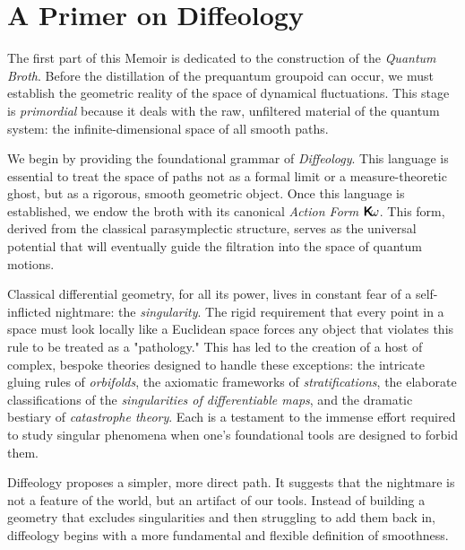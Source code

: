 \documentclass[10pt,reqno,letterpaper,twoside]{amsbook}
\begin{document}
  
  
  \chapter{A Primer on Diffeology}
  \label{chap:A Primer on Diffeology}
  
  The first part of this Memoir is dedicated to the construction of the \emph{Quantum Broth}.
  Before the distillation of the prequantum groupoid can occur,
  we must establish the geometric reality of the space of dynamical fluctuations.
  This stage is \emph{primordial} because it deals with the raw,
  unfiltered material of the quantum system:
  the infinite-dimensional space of all smooth paths.
  
  We begin by providing the foundational grammar of \emph{Diffeology}.
  This language is essential to treat the space of paths not as a formal limit or a measure-theoretic ghost,
  but as a rigorous,
  smooth geometric object.
  Once this language is established,
  we endow the broth with its canonical \emph{Action Form} $\boldsymbol{\mathsf{K}}\!\omega$.
  This form,
  derived from the classical parasymplectic structure,
  serves as the universal potential that will eventually guide the filtration into the space of quantum motions.
  
  Classical differential geometry,
  for all its power,
  lives in constant fear of a self-inflicted nightmare:
  the \emph{singularity}.
  The rigid requirement that every point in a space must look locally like a Euclidean space forces any object that violates this rule to be treated as a "pathology."
  This has led to the creation of a host of complex,
  bespoke theories designed to handle these exceptions:
  the intricate gluing rules of \emph{orbifolds},
  the axiomatic frameworks of \emph{stratifications},
  the elaborate classifications of the \emph{singularities of differentiable maps},
  and the dramatic bestiary of \emph{catastrophe theory}.
  Each is a testament to the immense effort required to study singular phenomena when one's foundational tools are designed to forbid them.
  
  Diffeology proposes a simpler,
  more direct path.
  It suggests that the nightmare is not a feature of the world,
  but an artifact of our tools.
  Instead of building a geometry that excludes singularities and then struggling to add them back in,
  diffeology begins with a more fundamental and flexible definition of smoothness.
  
\end{document}
